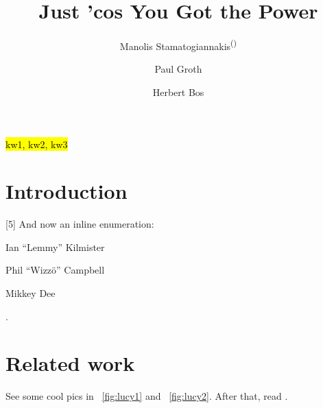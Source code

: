 \documentclass{llncs}
\newcommand{\figref}[1]{\figurename~\ref{#1}\xspace}
\newcommand{\hlc}[2][yellow]{ {\sethlcolor{#1} \hl{#2}} }
\begin{document}

\title{Just 'cos You Got the Power}
\author{Manolis Stamatogiannakis\textsuperscript{(\Letter)} \and Paul Groth \and Herbert Bos}

\maketitle


\begin{abstract}
\blindtext
\end{abstract}

\begin{keywords}\hlc{kw1, kw2, kw3}\end{keywords}


\section{Introduction}
\blindtext[1]
[5]
\blindtext[1]
And now an inline enumeration:
\begin{enumerate*}[label=\itshape\alph*\upshape)]
\item Ian ``Lemmy'' Kilmister
\item Phil ``Wizzö'' Campbell
\item Mikkey Dee
\end{enumerate*}.


\section{Related work}

See some cool pics in \figref{fig:lucy1} and \figref{fig:lucy2}.
After that, read \cite{Stamatogiannakis:BlackBox:IPAW:2014}.
\end{document}
